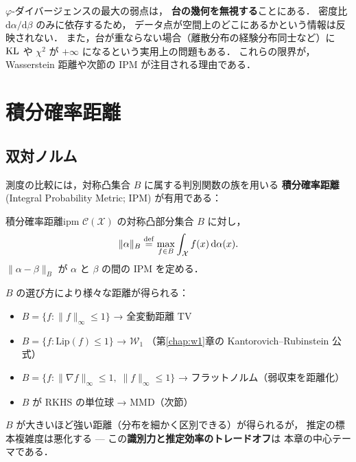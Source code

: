 $\varphi$-ダイバージェンスの最大の弱点は，
\textbf{台の幾何を無視する}ことにある．
密度比 $\mathrm{d}\alpha / \mathrm{d}\beta$ のみに依存するため，
データ点が空間上のどこにあるかという情報は反映されない．
また，台が重ならない場合（離散分布の経験分布同士など）に
$\operatorname{KL}$ や $\chi^2$ が $+\infty$ になるという実用上の問題もある．
これらの限界が，Wasserstein 距離や次節の IPM が注目される理由である．


\section{積分確率距離}\label{sec:ipm}

\subsection{双対ノルム}\label{subsec:dual-norm}

測度の比較には，対称凸集合 $B$ に属する判別関数の族を用いる
\textbf{積分確率距離} (Integral Probability Metric; IPM) が有用である：

\begin{definition}{積分確率距離}{ipm}
$\mathcal{C}(\mathcal{X})$ の対称凸部分集合 $B$ に対し，
\begin{equation}\label{eq:ipm}
  \|\alpha\|_B \overset{\mathrm{def}}{=} \max_{f \in B}
  \int_{\mathcal{X}} f(x)\, \mathrm{d}\alpha(x).
\end{equation}
$\|\alpha - \beta\|_B$ が $\alpha$ と $\beta$ の間の IPM を定める．
\end{definition}

$B$ の選び方により様々な距離が得られる：

\begin{itemize}
  \item $B = \{f : \|f\|_\infty \leq 1\}$ → 全変動距離 $\mathrm{TV}$
  \item $B = \{f : \mathrm{Lip}(f) \leq 1\}$ → $\mathcal{W}_1$
    （第\ref{chap:w1}章の Kantorovich--Rubinstein 公式）
  \item $B = \{f : \|\nabla f\|_\infty \leq 1,\; \|f\|_\infty \leq 1\}$
    → フラットノルム（弱収束を距離化）
  \item $B$ が RKHS の単位球 → MMD（次節）
\end{itemize}

$B$ が大きいほど強い距離（分布を細かく区別できる）が得られるが，
推定の標本複雑度は悪化する --- この\textbf{識別力と推定効率のトレードオフ}は
本章の中心テーマである．

